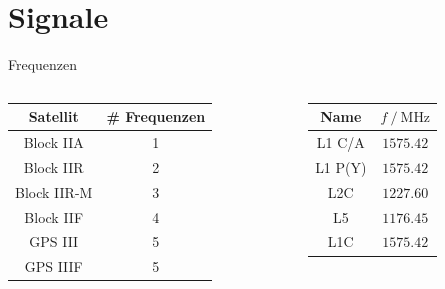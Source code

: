 \section{Signale}
\label{sec:signale}

\begin{frame}{Frequenzen}
    \begin{columns}
        \begin{column}{0.5\textwidth}
            \begin{table}
                \centering
                \begin{tabular}{c S[table-format=1.0]}
                    \toprule
                    {Satellit} & {\# Frequenzen} \\
                    \midrule
                    Block IIA   & 1 \\
                    Block IIR   & 2 \\
                    Block IIR-M & 3 \\
                    Block IIF   & 4 \\
                    GPS III     & 5 \\
                    GPS IIIF    & 5 \\
                    \bottomrule
                \end{tabular}
            \end{table}
        \end{column}
        \begin{column}{0.5\textwidth}
            \begin{table}
                \centering
                \begin{tabular}{c S[table-format=4.2]}
                    \toprule
                    {Name} & {$f\:/\:\si{\mega\hertz}$} \\
                    \midrule
                    L1 C/A  & $\num{1575.42}$ \\
                    L1 P(Y) & $\num{1575.42}$ \\
                    L2C     & $\num{1227.60}$ \\
                    L5      & $\num{1176.45}$ \\
                    L1C     & $\num{1575.42}$ \\
                    \bottomrule
                \end{tabular}
            \end{table}
        \end{column}
    \end{columns}
\end{frame}

